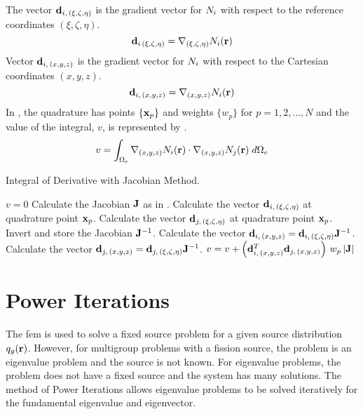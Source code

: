     The vector $\mathbf{d}_{i,\,(\xi,\zeta,\eta)}$ is the gradient vector for
    $N_i$ with respect to the reference coordinates $(\xi,\zeta,\eta)$.
    \begin{equation}
      \mathbf{d}_{i\,(\xi,\zeta,\eta)} = \mathbf{\nabla}_{(\xi,\zeta,\eta)} N_i(\mathbf{r}) 
    \end{equation}
    Vector $\mathbf{d}_{i,\,(x,y,z)}$ is the gradient vector for $N_i$ with
    respect to the Cartesian coordinates $(x,y,z)$. 
    \begin{equation}
      \mathbf{d}_{i,\,(x,y,z)} = \mathbf{\nabla}_{(x,y,z)} N_i(\mathbf{r})
    \end{equation}
    In , the quadrature has points $\{\mathbf{x}_p\}$ 
    and weights $\{w_p\}$ for $p = 1,2,\ldots,N$ and the value of the integral,
    $v$, is represented by .
    \begin{equation}
      \label{eq:deriv_integral}
      v = \int_{\Omega_e} \mathbf{\nabla}_{(x,y,z)} N_i(\mathbf{r}) \cdot 
        \mathbf{\nabla}_{(x,y,z)} N_j(\mathbf{r}) \; d\Omega_e
    \end{equation}

    \begin{algorithm}
      \caption{Integral of Derivative with Jacobian Method.}
      \label{algorithm:deriv_int}
      \begin{algorithmic}[1]
        \State $v=0$
          \State Calculate the Jacobian $\mathbf{J}$ as in .
          \State Calculate the vector $\mathbf{d}_{i,\,(\xi,\zeta,\eta)}$ at quadrature
            point $\mathbf{x}_p$.
          \State Calculate the vector $\mathbf{d}_{j,\,(\xi,\zeta,\eta)}$ at quadrature
            point $\mathbf{x}_p$.
          \State Invert and store the Jacobian $\mathbf{J}^{-1}$.
          \State Calculate the vector $\mathbf{d}_{i,\,(x,y,z)} =
            \mathbf{d}_{i,\,(\xi,\zeta,\eta)} \mathbf{J}^{-1}$.
          \State Calculate the vector $\mathbf{d}_{j,\,(x,y,z)} =
            \mathbf{d}_{j,\,(\xi,\zeta,\eta)} \mathbf{J}^{-1}$.
          \State $v = v + \left(\mathbf{d}_{i,\,(x,y,z)}^{T} \mathbf{d}_{j,\,(x,y,z)}\right)
            \, w_p \, \lvert \mathbf{J} \rvert$
        \EndFor
      \end{algorithmic}
    \end{algorithm}

\section{Power Iterations}
  \label{sec:power_iterations}
  The \gls{fem} is used to solve a fixed source problem for a given source
  distribution $q_g(\mathbf{r})$. However, for multigroup problems with a fission
  source, the problem is an eigenvalue problem and the source is not known.
  For eigenvalue problems, the problem does not have a fixed source and the
  system has many solutions. The method of Power Iterations allows eigenvalue
  problems to be solved iteratively for the fundamental eigenvalue and
  eigenvector.

